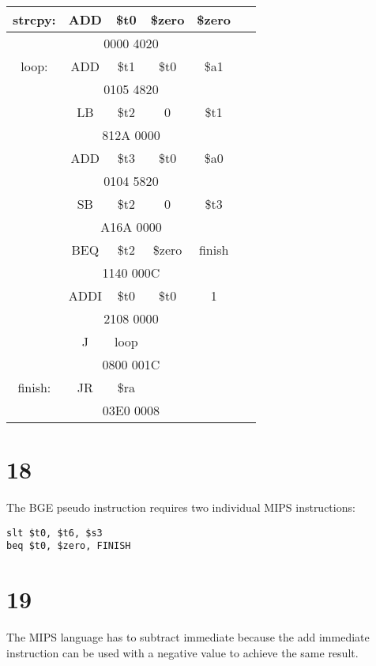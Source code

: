 \documentclass[a4paper,11pt]{article}
\begin{document}
\begin{tabular}{  | c | c | c | c | c | c |  }
  \hline
  strcpy: & ADD & \$t0 & \$zero & \$zero&   \\ \hline
           \multicolumn{6}{|c|}{0000 4020}  \\ \hline
 loop: & ADD & \$t1 & \$t0 & \$a1 &  \\ \hline
         \multicolumn{6}{|c|}{0105 4820} \\ \hline
           & LB & \$t2 & 0 & \$t1 &   \\ \hline
        \multicolumn{6}{|c|}{812A 0000}  \\ \hline
           & ADD & \$t3 & \$t0 & \$a0 & \\ \hline
       \multicolumn{6}{|c|}{0104 5820}  \\ \hline
           & SB & \$t2 & 0 & \$t3 &  \\ \hline
          \multicolumn{6}{|c|}{A16A 0000}  \\ \hline
           & BEQ & \$t2 & \$zero & finish &  \\ \hline
       \multicolumn{6}{|c|}{1140 000C}  \\ \hline
           & ADDI & \$t0 & \$t0 & 1 &  \\ \hline
        \multicolumn{6}{|c|}{2108 0000}  \\ \hline
           & J & loop &  &  &  \\ \hline
       \multicolumn{6}{|c|}{0800 001C}  \\ \hline
finish: & JR & \$ra &  &  & \  \\ \hline
       \multicolumn{6}{|c|}{03E0 0008}   \\ \hline
\end{tabular}


\section*{18}
The BGE pseudo instruction requires two individual MIPS instructions:
\begin{verbatim}
slt $t0, $t6, $s3
beq $t0, $zero, FINISH 
\end{verbatim}



\section*{19}
The MIPS language has to subtract immediate because the add immediate instruction can be used with a negative value to achieve the same result.  
\end{document}
